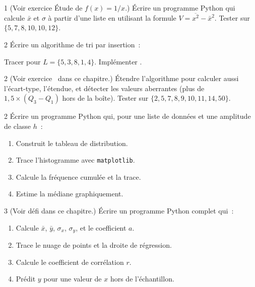 \begin{bilan}
\begin{exo}{1}
(Voir exercice \'Etude de $f(x)=1/x$.)
\'Ecrire un programme Python qui calcule $\bar{x}$ et $\sigma$
\`a partir d'une liste en utilisant la formule $V=\overline{x^2}-\bar{x}^2$.
Tester sur $\{5,7,8,10,10,12\}$.
\end{exo}

\begin{exo}{2}
\'Ecrire un algorithme de tri par insertion~:

\begin{algorithm}[H]
\caption{Tri par insertion}
\end{algorithm}

Tracer pour $L=\{5,3,8,1,4\}$. Impl\'ementer \computer.
\end{exo}

\begin{exo}{2}
(Voir exercice \logicoalgo\ dans ce chapitre.)
\'Etendre l'algorithme pour calculer aussi l'\'ecart-type, l'\'etendue,
et d\'etecter les valeurs aberrantes (plus de $1{,}5\times(Q_3-Q_1)$
hors de la bo\^ite).
Tester sur $\{2,5,7,8,9,10,11,14,50\}$.
\end{exo}

\begin{exo}{2}
\'Ecrire un programme Python qui, pour une liste de donn\'ees et
une amplitude de classe $h$~:
\begin{enumerate}
  \item Construit le tableau de distribution.
  \item Trace l'histogramme avec \texttt{matplotlib}.
  \item Calcule la fr\'equence cumul\'ee et la trace.
  \item Estime la m\'ediane graphiquement.
\end{enumerate}
\end{exo}

\begin{exo}{3}
(Voir d\'efi dans ce chapitre.)
\'Ecrire un programme Python complet qui~:
\begin{enumerate}
  \item Calcule $\bar{x}$, $\bar{y}$, $\sigma_x$, $\sigma_y$, et le coefficient $a$.
  \item Trace le nuage de points et la droite de r\'egression.
  \item Calcule le coefficient de corr\'elation $r$.
  \item Pr\'edit $y$ pour une valeur de $x$ hors de l'\'echantillon.
\end{enumerate}
\end{exo}


\end{bilan}
